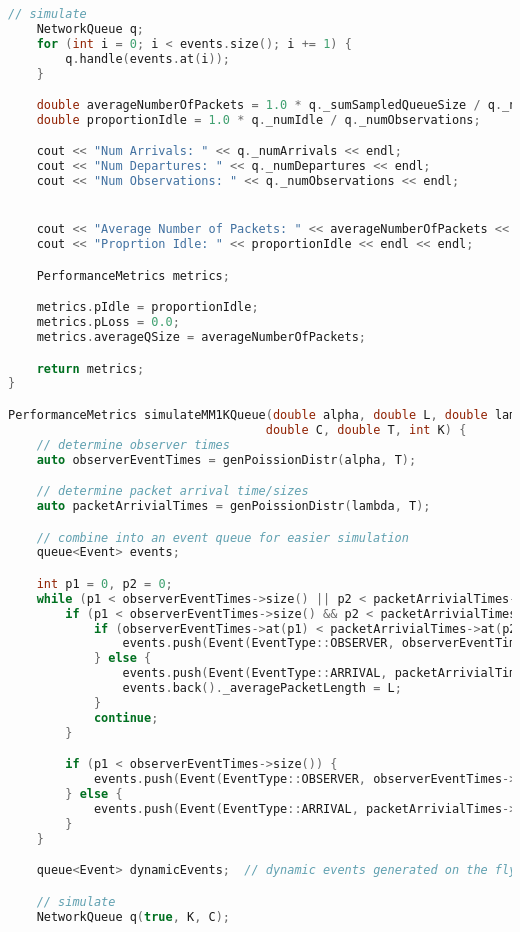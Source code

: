 \documentclass{article}
\begin{document}
\begin{lstlisting}[language=C++,
                   directivestyle={\color{black}}
                   emph={int,char,double,float,unsigned},
                   emphstyle={\color{blue}}
                  ]
    // simulate
    NetworkQueue q;
    for (int i = 0; i < events.size(); i += 1) {
        q.handle(events.at(i));
    }

    double averageNumberOfPackets = 1.0 * q._sumSampledQueueSize / q._numObservations;
    double proportionIdle = 1.0 * q._numIdle / q._numObservations;

    cout << "Num Arrivals: " << q._numArrivals << endl;
    cout << "Num Departures: " << q._numDepartures << endl;
    cout << "Num Observations: " << q._numObservations << endl;


    cout << "Average Number of Packets: " << averageNumberOfPackets << endl;
    cout << "Proprtion Idle: " << proportionIdle << endl << endl;

    PerformanceMetrics metrics;

    metrics.pIdle = proportionIdle;
    metrics.pLoss = 0.0;
    metrics.averageQSize = averageNumberOfPackets;

    return metrics;
}

PerformanceMetrics simulateMM1KQueue(double alpha, double L, double lambda,
                                    double C, double T, int K) {
    // determine observer times
    auto observerEventTimes = genPoissionDistr(alpha, T);

    // determine packet arrival time/sizes
    auto packetArrivialTimes = genPoissionDistr(lambda, T);

    // combine into an event queue for easier simulation
    queue<Event> events;

    int p1 = 0, p2 = 0;
    while (p1 < observerEventTimes->size() || p2 < packetArrivialTimes->size()) {
        if (p1 < observerEventTimes->size() && p2 < packetArrivialTimes->size()) {
            if (observerEventTimes->at(p1) < packetArrivialTimes->at(p2)) {
                events.push(Event(EventType::OBSERVER, observerEventTimes->at(p1++)));
            } else {
                events.push(Event(EventType::ARRIVAL, packetArrivialTimes->at(p2++)));
                events.back()._averagePacketLength = L;
            }
            continue;
        }

        if (p1 < observerEventTimes->size()) {
            events.push(Event(EventType::OBSERVER, observerEventTimes->at(p1++)));
        } else {
            events.push(Event(EventType::ARRIVAL, packetArrivialTimes->at(p2++)));
        }
    }

    queue<Event> dynamicEvents;  // dynamic events generated on the fly

    // simulate
    NetworkQueue q(true, K, C);


\end{lstlisting}
\end{document}
